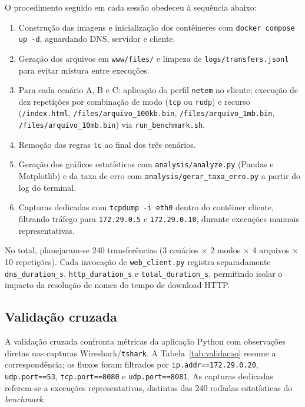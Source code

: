\documentclass[12pt]{article}
\begin{document}
O procedimento seguido em cada sessão obedeceu à sequência abaixo:

\begin{enumerate}
  \item Construção das imagens e inicialização dos contêineres com
        \texttt{docker compose up -d}, aguardando DNS, servidor e cliente.
  \item Geração dos arquivos em \texttt{www/files/} e limpeza de
        \texttt{logs/transfers.jsonl} para evitar mistura entre execuções.
  \item Para cada cenário A, B e C: aplicação do perfil \texttt{netem} no cliente;
        execução de dez repetições por combinação de modo (\texttt{tcp} ou
        \texttt{rudp}) e recurso (\texttt{/index.html},
        \texttt{/files/arquivo\_100kb.bin}, \texttt{/files/arquivo\_1mb.bin},
        \texttt{/files/arquivo\_10mb.bin}) via \texttt{run\_benchmark.sh}.
  \item Remoção das regras \texttt{tc} ao final dos três cenários.
  \item Geração dos gráficos estatísticos com \texttt{analysis/analyze.py}
        (Pandas e Matplotlib) e da taxa de erro com
        \texttt{analysis/gerar\_taxa\_erro.py} a partir do log do terminal.
  \item Capturas dedicadas com \texttt{tcpdump -i eth0} dentro do contêiner
        cliente, filtrando tráfego para \texttt{172.29.0.5} e
        \texttt{172.29.0.10}, durante execuções manuais representativas.
\end{enumerate}

No total, planejaram-se 240 transferências (3 cenários $\times$ 2 modos
$\times$ 4 arquivos $\times$ 10 repetições). Cada invocação de
\texttt{web\_client.py} registra separadamente \texttt{dns\_duration\_s},
\texttt{http\_duration\_s} e \texttt{total\_duration\_s}, permitindo isolar o
impacto da resolução de nomes do tempo de download HTTP.

\subsection{Validação cruzada}

A validação cruzada confronta métricas da aplicação Python com observações
diretas nas capturas Wireshark/\texttt{tshark}. A Tabela~\ref{tab:validacao}
resume a correspondência; os fluxos foram filtrados por
\texttt{ip.addr==172.29.0.20}, \texttt{udp.port==53}, \texttt{tcp.port==8080} e
\texttt{udp.port==8081}. As capturas dedicadas referem-se a execuções
representativas, distintas das 240 rodadas estatísticas do \emph{benchmark}.
\end{document}
